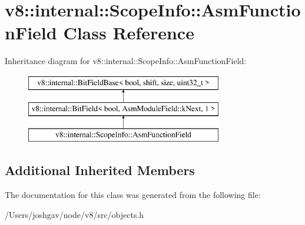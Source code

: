 \hypertarget{classv8_1_1internal_1_1_scope_info_1_1_asm_function_field}{}\section{v8\+:\+:internal\+:\+:Scope\+Info\+:\+:Asm\+Function\+Field Class Reference}
\label{classv8_1_1internal_1_1_scope_info_1_1_asm_function_field}
Inheritance diagram for v8\+:\+:internal\+:\+:Scope\+Info\+:\+:Asm\+Function\+Field\+:\begin{figure}[H]
\begin{center}
\leavevmode
\includegraphics[height=3.000000cm]{classv8_1_1internal_1_1_scope_info_1_1_asm_function_field}
\end{center}
\end{figure}
\subsection*{Additional Inherited Members}


The documentation for this class was generated from the following file\+:\begin{DoxyCompactItemize}
\item 
/\+Users/joshgav/node/v8/src/objects.\+h\end{DoxyCompactItemize}
